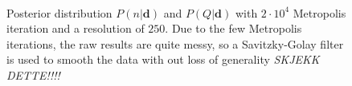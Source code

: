 \documentclass{emulateapj}
\begin{document}
\begin{figure}[t]
\centering
{}\\
\caption{Posterior distribution $P(n|\mathbf{d})$ and $P(Q|\mathbf{d})$ with $2\cdot 10^4$ Metropolis iteration and a resolution of $250$. Due to the few Metropolis iterations, the raw results are quite messy, so a Savitzky-Golay filter is used to smooth the data with out loss of generality \emph{SKJEKK DETTE!!!!}}
\label{fig:QnDist}
\end{figure}
\end{document}
